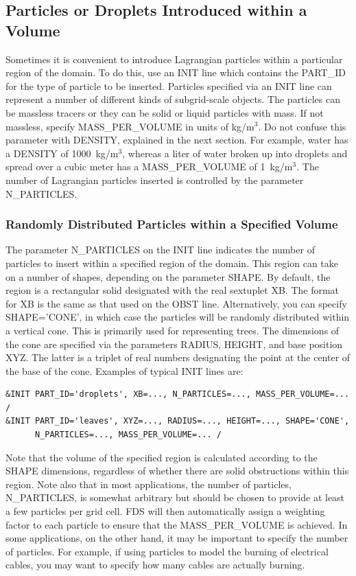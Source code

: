 \documentclass[11pt]{book}
\begin{document}
\subsection{Particles or Droplets Introduced within a Volume}
\label{info:initial_droplets}

Sometimes it is convenient to introduce Lagrangian particles within a particular region of the domain. To do this, use an {\ct INIT} line which contains the {\ct PART\_ID} for the type of particle to be inserted. Particles specified via an {\ct INIT} line can represent a number of different kinds of subgrid-scale objects. The particles can be massless tracers or they can be solid or liquid particles with mass. If not massless, specify {\ct MASS\_PER\_VOLUME} in units of kg/m$^3$. Do not confuse this parameter with {\ct DENSITY}, explained in the next section.
For example, water has a {\ct DENSITY} of 1000~kg/m$^3$, whereas a liter of water broken up into droplets and spread over a cubic meter has a {\ct MASS\_PER\_VOLUME} of 1~kg/m$^3$. The number of Lagrangian particles inserted is controlled by the parameter {\ct N\_PARTICLES}.

\subsubsection{Randomly Distributed Particles within a Specified Volume}

The parameter {\ct N\_PARTICLES} on the {\ct INIT} line indicates the number of particles to insert within a specified region of the domain. This region can take on a number of shapes, depending on the parameter {\ct SHAPE}. By default, the region is a rectangular solid designated with the real sextuplet {\ct XB}.
The format for {\ct XB} is the same as that used on the {\ct OBST} line. Alternatively, you can specify {\ct SHAPE='CONE'}, in which case the particles will be randomly distributed within a vertical cone. This is primarily used for representing trees. The dimensions of the cone are specified via the parameters {\ct RADIUS}, {\ct HEIGHT}, and base position {\ct XYZ}. The latter is a triplet of real numbers designating the point at the center of the base of the cone. Examples of typical {\ct INIT} lines are:
\begin{lstlisting}
&INIT PART_ID='droplets', XB=..., N_PARTICLES=..., MASS_PER_VOLUME=... /
&INIT PART_ID='leaves', XYZ=..., RADIUS=..., HEIGHT=..., SHAPE='CONE',
      N_PARTICLES=..., MASS_PER_VOLUME=... /
\end{lstlisting}
Note that the volume of the specified region is calculated according to the {\ct SHAPE} dimensions, regardless of whether there are solid obstructions within this region. Note also that in most applications, the number of particles, {\ct N\_PARTICLES}, is somewhat arbitrary but should be chosen to provide at least a few particles per grid cell. FDS will then automatically assign a weighting factor to each particle to ensure that the {\ct MASS\_PER\_VOLUME} is achieved. In some applications, on the other hand, it may be important to specify the number of particles. For example, if using particles to model the burning of electrical cables, you may want to specify how many cables are actually burning.
\end{document}
